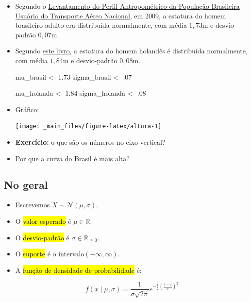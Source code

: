 \documentclass[
  11pt]{report}
\newenvironment{Shaded}{\begin{snugshade}}{\end{snugshade}}
\newcommand{\DecValTok}[1]{\textcolor[rgb]{0.00,0.00,0.81}{#1}}
\newcommand{\FloatTok}[1]{\textcolor[rgb]{0.00,0.00,0.81}{#1}}
\newcommand{\NormalTok}[1]{#1}
\newcommand{\OtherTok}[1]{\textcolor[rgb]{0.56,0.35,0.01}{#1}}
\renewenvironment{Shaded}{
    \begin{mdframed}[%
      roundcorner=2pt,%
      innerleftmargin=5pt,%
      innerrightmargin=5pt,%
      topline=true,%
      leftline=true,%
      rightline=true,%
      bottomline=true,%
      linewidth=0.5pt,%
      linecolor=black!20,%
      backgroundcolor=black!2,%
      skipabove=2ex,%
      skipbelow=2.5ex%
    ]%
  }
  {
    \end{mdframed}
  }
\begin{document}
\begin{itemize}
\item
  Segundo o \href{https://pdf4pro.com/view/levantamento-do-perfil-antropom-201-trico-10652c.html}{Levantamento do Perfil Antropométrico da População Brasileira Usuária do Transporte Aéreo Nacional}, em 2009, a estatura do homem brasileiro adulto era distribuída normalmente, com média $1{,}73$m e desvio-padrão $0{,}07$m.
\item
  Segundo \href{https://www.pearson.com/us/higher-education/product/De-Veaux-Stats-Data-and-Models-Plus-NEW-My-Lab-Statistics-with-Pearson-e-Text-Access-Card-Package-4th-Edition/9780133956498.html}{este livro}, a estatura do homem holandês é distribuída normalmente, com média $1{,}84$m e desvio-padrão $0{,}08$m.

\begin{Shaded}
\begin{Highlighting}[]
\NormalTok{mu\_brasil }\OtherTok{\textless{}{-}} \FloatTok{1.73}
\NormalTok{sigma\_brasil }\OtherTok{\textless{}{-}}\NormalTok{ .}\DecValTok{07}

\NormalTok{mu\_holanda }\OtherTok{\textless{}{-}} \FloatTok{1.84}
\NormalTok{sigma\_holanda }\OtherTok{\textless{}{-}}\NormalTok{ .}\DecValTok{08}
\end{Highlighting}
\end{Shaded}
\item
  Gráfico:

  \begin{center}\texttt{[image: \_main\_files/figure-latex/altura-1]} \end{center}
\item
  \textbf{Exercício:} o que são os números no eixo vertical?
\item
  Por que a curva do Brasil é mais alta?
\end{itemize}

\hypertarget{no-geral-7}{%
\subsection{No geral}\label{no-geral-7}}

\begin{itemize}
\item
  Escrevemos $X \sim \mathcal{N}(\mu, \sigma)$.
\item
  O {\hl{valor esperado}} é $\mu \in \mathbb{R}$.
\item
  O {\hl{desvio-padrão}} é $\sigma \in \mathbb{R}_{\geq 0}$.
\item
  O {\hl{suporte}} é o intervalo$(-\infty, \infty)$.
\item
  A {\hl{função de densidade de probabilidade}} é:

  \[
  f(x \mid \mu, \sigma) = 
  \frac{1}{\sigma \sqrt{2\pi}} 
    e^{-\frac{1}{2}\left(\frac{x - \mu}{\sigma}\right)^2} 
  \]
\end{itemize}
\end{document}
